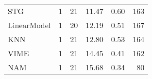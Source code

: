 \begin{tabular}{lrrrrr}
STG                &                  1 &  21 &  11.47 &                           0.60 &   163 \\
LinearModel        &                  1 &  20 &  12.19 &                           0.51 &   167 \\
KNN                &                  1 &  21 &  12.80 &                           0.53 &   164 \\
VIME               &                  1 &  21 &  14.45 &                           0.41 &   162 \\
NAM                &                  1 &  21 &  15.68 &                           0.34 &    80 \\
\bottomrule
\end{tabular}
